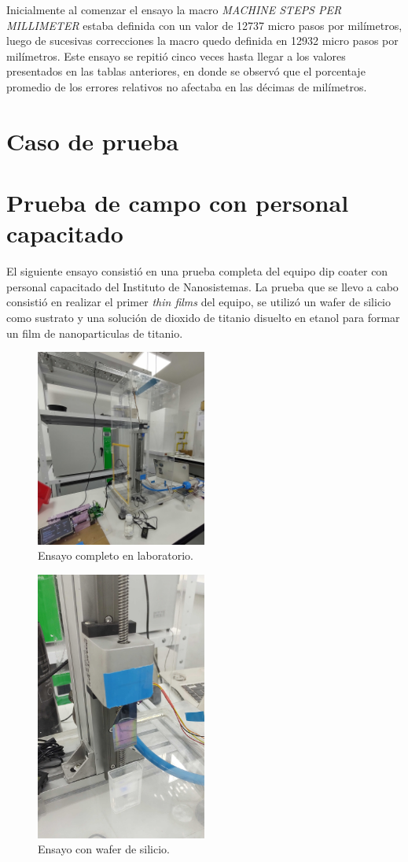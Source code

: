 Inicialmente al comenzar el ensayo la macro \textit{MACHINE STEPS PER MILLIMETER}  estaba definida con un valor de 12737 micro pasos por milímetros, luego de sucesivas correcciones la macro quedo definida en 12932 micro pasos por milímetros.
Este ensayo se repitió cinco veces hasta llegar a los valores presentados en las tablas anteriores, en donde se observó que el porcentaje promedio de los errores relativos no afectaba en las décimas de milímetros.

\section{Caso de prueba}
\section{Prueba de campo con personal capacitado}

El siguiente ensayo consistió en una prueba completa del equipo dip coater con personal capacitado del Instituto de Nanosistemas.
La prueba que se llevo a cabo consistió en realizar el primer \textit{thin films} del equipo, se utilizó un wafer de silicio como sustrato y una solución de dioxido de titanio disuelto en etanol para formar un film de nanoparticulas de titanio.

\begin{figure}[h]
\centering 
\includegraphics[width=0.5\textwidth]{./Figures/prueba_b.jpg}
\caption{Ensayo completo en laboratorio.}
\label{fig:desplazamiento_lineal}
\end{figure}


\begin{figure}[h]
\centering 
\includegraphics[width=0.5\textwidth]{./Figures/prueba_a.jpg}
\caption{Ensayo con wafer de silicio.}
\label{fig:desplazamiento_lineal}
\end{figure}


